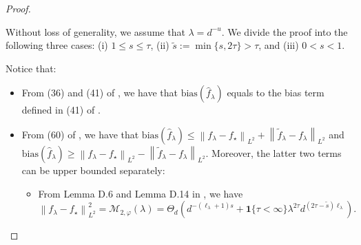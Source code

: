 \documentclass{article}
\theoremstyle{plain}
\theoremstyle{definition}
\theoremstyle{remark}
\newcommand{\dhnote}[1]{{\color{red}[#1]} } %
\begin{document}
\begin{appendix}
\begin{proof}
\begin{itemize}

\end{itemize}




Without loss of generality, we assume that $\lambda=d^{-u}$.
We divide the proof into the following three cases: (i) $1 \leq s \leq \tau$, (ii) $\tilde{s}:=\min\{s, 2\tau\} > \tau$, and (iii) $0<s<1$.

    Notice that:
    \begin{itemize}
        \item From (36) and (41) of \cite{lu2024saturation}, we have that $\mathrm{bias}(\hat{f}_{\lambda})$ equals to the bias term defined in (41) of \cite{lu2024saturation}.

        \item From (60) of \cite{lu2024saturation}, we have that $\mathrm{bias}(\hat{f}_{\lambda}) \leq \left\| f_{\lambda} - f_{\star}\right\|_{L^{2}} 
    +
    \left\| \tilde{f}_{\lambda} - f_{\lambda}\right\|_{L^{2}}$ and $\mathrm{bias}(\hat{f}_{\lambda}) \geq \left\| f_{\lambda} - f_{\star}\right\|_{L^{2}} 
    -
    \left\| \tilde{f}_{\lambda} - f_{\lambda}\right\|_{L^{2}}$. Moreover, the latter two terms can be upper bounded separately:
    \begin{itemize}
        \item From Lemma D.6 and Lemma D.14 in \cite{lu2024saturation}, we have 
        $$
        \left\| f_{\lambda} - f_{\star}\right\|_{L^{2}}^2 = \mathcal{M}_{2, \varphi}(\lambda) = \Theta_d\left( 
    d^{-(\ell_{\lambda}+1)s}
    +\mathbf{1}\{\tau<\infty\}\lambda^{2\tau}d^{(2\tau-\tilde{s})\ell_{\lambda} }\right).
        $$


\end{itemize}
\end{itemize}
\end{proof}
\end{appendix}
\end{document}

